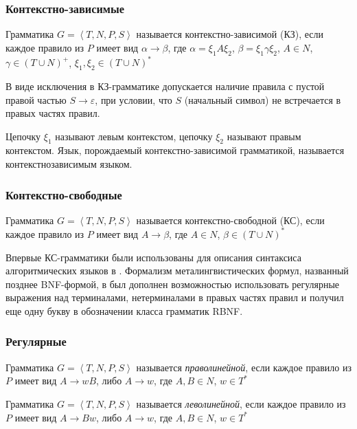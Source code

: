 \subsubsection{Контекстно-зависимые}

Грамматика $G = \left\langle {T, N, P, S} \right\rangle$ называется контекстно-зависимой (КЗ),
если каждое правило из $P$ имеет вид $\alpha \rightarrow \beta$, где $\alpha = \xi_1A\xi_2$, 
$\beta = \xi_1 \gamma \xi_2$, $A \in N$, $\gamma \in (T \cup N)^{+}$, $\xi_1, \xi_2 \in (T \cup N)^{*}$

В виде исключения в КЗ-грамматике допускается наличие правила с пустой правой частью
$S → \varepsilon$, при условии, что $S$ (начальный символ) не встречается в правых частях правил.

Цепочку $\xi_1$ называют левым контекстом, цепочку $\xi_2$ называют правым контекстом. 
Язык, порождаемый контекстно-зависимой грамматикой, называется контекстнозависимым языком.

\subsubsection{Контекстно-свободные}

Грамматика $G = \left\langle {T, N, P, S} \right\rangle$ называется контекстно-свободной (КС),
если каждое правило из $P$ имеет вид $A \rightarrow \beta$, где $A \in N$,
$\beta \in (T \cup N)^{*}$

Впервые КС-грамматики были использованы для описания синтаксиса алгоритмических 
языков в \cite{bib22}. Формализм металингвистических формул, названный позднее BNF-формой, 
в \cite{bib23} был дополнен возможностью использовать регулярные выражения над терминалами, 
нетерминалами в правых частях правил и получил еще одну букву в обозначении класса грамматик RBNF. 

\subsubsection{Регулярные}

Грамматика $G = \left\langle {T, N, P, S} \right\rangle$ называется \textit{праволинейной},
если каждое правило из $P$ имеет вид $A \rightarrow wB$, либо $A \rightarrow w$, 
где $A, B \in N$, $w \in T^{*}$ 

Грамматика $G = \left\langle {T, N, P, S} \right\rangle$ называется \textit{леволинейной},
если каждое правило из $P$ имеет вид $A \rightarrow Bw$, либо $A \rightarrow w$, 
где $A, B \in N$, $w \in T^{*}$ 

